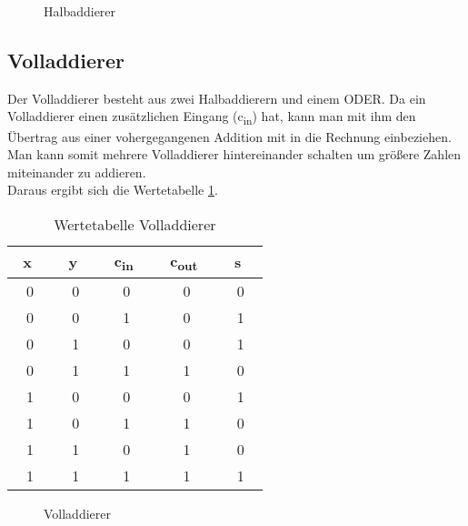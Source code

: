 \documentclass[a4paper,12pt,fleqn,oneside]{article}
\begin{document}
	\begin{figure}[h]
		\center
		
		\caption{Halbaddierer}
		\label{fig:halbaddierer}
	\end{figure}


\newpage
	\subsection{Volladdierer}
	Der Volladdierer besteht aus zwei Halbaddierern und einem ODER. Da ein Volladdierer einen zusätzlichen Eingang 					(c\textsubscript{in}) hat, kann man mit ihm den Übertrag aus einer vohergegangenen Addition mit in die Rechnung einbeziehen. 		Man kann somit mehrere Volladdierer hintereinander schalten um größere Zahlen miteinander zu addieren.\\
	Daraus ergibt sich die Wertetabelle \ref{tab:volladdierer}.

	
	
	\begin{table}[h]
\center
\begin{tabular}{c|c|c|c|c}
\textbf{ \ x \ } & \textbf{ \ y \ } & \textbf{ \ c\textsubscript{in} \ } & \textbf{ \ c\textsubscript{out} \ } & \multicolumn{1}{l}{\textbf \ {s \ }} \\ \hline
0          & 0          & 0            & 0             & 0                              \\ \hline
0          & 0          & 1            & 0             & 1                              \\ \hline
0          & 1          & 0            & 0             & 1                              \\ \hline
0          & 1          & 1            & 1             & 0                              \\ \hline
1          & 0          & 0            & 0             & 1                              \\ \hline
1          & 0          & 1            & 1             & 0                              \\ \hline
1          & 1          & 0            & 1             & 0                              \\ \hline
1          & 1          & 1            & 1             & 1                             
\end{tabular}
\caption{Wertetabelle Volladdierer}
\label{tab:volladdierer}
\end{table}


\begin{figure}[h]
		\center
		
		\caption{Volladdierer}
		\label{fig:volladdierer}
	\end{figure}
\end{document}
